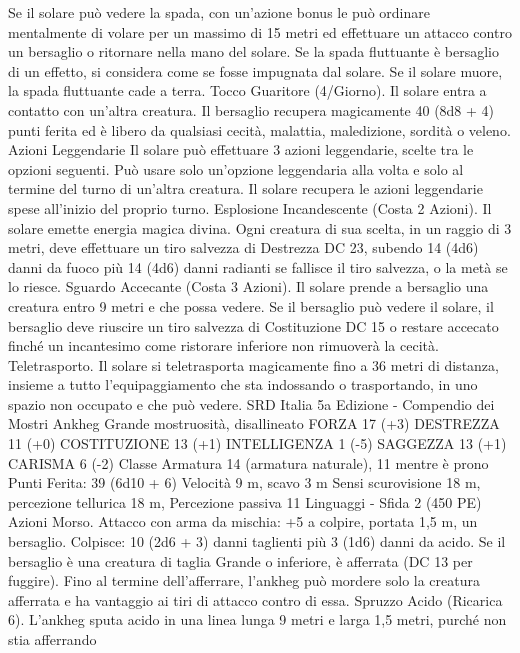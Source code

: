 \begin{multicols}{2}
Se il solare può vedere la spada, con un’azione bonus le può
ordinare mentalmente di volare per un massimo di 15 metri ed
effettuare un attacco contro un bersaglio o ritornare nella mano
del solare. Se la spada fluttuante è bersaglio di un effetto, si
considera come se fosse impugnata dal solare. Se il solare muore,
la spada fluttuante cade a terra.
Tocco Guaritore (4/Giorno). Il solare entra a contatto con
un’altra creatura. Il bersaglio recupera magicamente 40 (8d8 + 4)
punti ferita ed è libero da qualsiasi cecità, malattia, maledizione,
sordità o veleno.
Azioni Leggendarie
Il solare può effettuare 3 azioni leggendarie, scelte tra le opzioni
seguenti. Può usare solo un’opzione leggendaria alla volta e solo
al termine del turno di un’altra creatura. Il solare recupera le
azioni leggendarie spese all’inizio del proprio turno.
Esplosione Incandescente (Costa 2 Azioni). Il solare emette
energia magica divina. Ogni creatura di sua scelta, in un raggio di 3
metri, deve effettuare un tiro salvezza di Destrezza DC 23, subendo
14 (4d6) danni da fuoco più 14 (4d6) danni radianti se fallisce il tiro
salvezza, o la metà se lo riesce.
Sguardo Accecante (Costa 3 Azioni). Il solare prende a
bersaglio una creatura entro 9 metri e che possa vedere. Se il
bersaglio può vedere il solare, il bersaglio deve riuscire un tiro
salvezza di Costituzione DC 15 o restare accecato finché un
incantesimo come ristorare inferiore non rimuoverà la cecità.
Teletrasporto. Il solare si teletrasporta magicamente fino a 36 metri
di distanza, insieme a tutto l’equipaggiamento che sta indossando o
trasportando, in uno spazio non occupato e che può vedere.
SRD Italia 5a Edizione - Compendio dei Mostri
Ankheg
Grande mostruosità, disallineato
FORZA 17 (+3)
DESTREZZA 11 (+0)
COSTITUZIONE 13 (+1)
INTELLIGENZA 1 (-5)
SAGGEZZA 13 (+1)
CARISMA 6 (-2)
Classe Armatura 14 (armatura naturale), 11 mentre è prono
\hspace*{0pt}\hfill{Punti Ferita}: 39 (6d10 + 6)
Velocità 9 m, scavo 3 m
Sensi scurovisione 18 m, percezione tellurica 18 m, Percezione
passiva 11
Linguaggi -
Sfida 2 (450 PE)
Azioni
Morso. Attacco con arma da mischia: +5 a colpire, portata 1,5
m, un bersaglio.
Colpisce: 10 (2d6 + 3) danni taglienti più 3 (1d6) danni da acido.
Se il bersaglio è una creatura di taglia Grande o inferiore, è
afferrata (DC 13 per fuggire). Fino al termine dell’afferrare,
l’ankheg può mordere solo la creatura afferrata e ha vantaggio ai
tiri di attacco contro di essa.
Spruzzo Acido (Ricarica 6). L’ankheg sputa acido in una linea
lunga 9 metri e larga 1,5 metri, purché non stia afferrando

\end{multicols}
